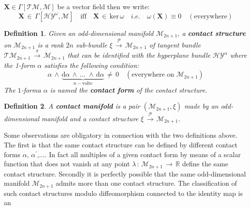 \documentclass[10pt,a4paper]{article}
\newtheorem{definizione}{Definition}[section]
\begin{document}
$\mathbf{X}\in \Gamma\left[\mathcal{TM},\mathcal{M}\right]$ be a vector field
then we write:
\begin{equation}\label{kernello}
    \mathbf{X} \, \in \, \Gamma\left[\mathcal{HY}^\omega,\mathcal{M}\right] \quad
    \text{iff} \quad \mathbf{X} \, \in \,\mathrm{ker}\, \omega \quad
    \textit{i.e.} \quad \omega\left(\mathbf{X}\right) \equiv 0 \quad
    (\text{everywhere})
\end{equation}
\begin{definizione}
\label{struttamorfa} Given an odd-dimensional manifold $\mathcal{M}_{2n+1}$,
a \textbf{contact structure} on
$\mathcal{M}_{2n+1}$  is a rank $2n$  sub-bundle  $\xi \,
\stackrel{\mathcal{P}}{\longrightarrow}\, \mathcal{M}_{2n+1}$  of
 tangent bundle $\mathcal{TM}_{2n+1} \,
\stackrel{\pi}{\longrightarrow}\, \mathcal{M}_{2n+1}$  that can be identified with the hyperplane bundle
 $\mathcal{HY}^\alpha$
where the  1-form $\alpha$  satisfies the following condition:
\begin{equation}\label{latisanaditiglio}
    \alpha \, \wedge \, \underbrace{\mathrm{d}\alpha \, \wedge \,\dots \, \, \wedge
    \,\mathrm{d}\alpha}_{n-\text{volte}} \, \neq \, 0 \quad
    (\text{everywhere on $\mathcal{M}_{2n+1}$})
\end{equation}
The $1$-forma $\alpha$  is named the \textbf{contact form} of the contact structure.
\end{definizione}
\begin{definizione}
\label{cuntavaria} A \textbf{contact manifold} is a pair
 $\left(\mathcal{ M}_{2n+1},\xi\right)$  made by an odd-dimensional manifold and a
contact structure $\xi \,
\stackrel{\mathcal{P}}{\longrightarrow}\, \mathcal{M}_{2n+1}$.
\end{definizione}
Some observations are obligatory in connection with the two definitions above. The first is that the same contact structure can be defined by different contact forms
$\alpha$, $\alpha^\prime$,$\dots$. In fact all multiples of a
given contact form by means  of a scalar function that does not vanish at any point $\lambda\, : \, \mathcal{ M}_{2n+1}\, \to
\, \mathbb{R}$  define the same contact structure.
Secondly it is perfectly possible that the same odd-dimensional manifold $\mathcal{ M}_{2n+1}$ admits more than one contact structure.
The classification of such contact structures modulo diffeomorphism connected to the identity map is an
\end{document}
